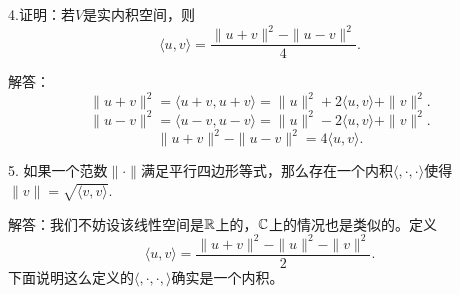 \documentclass[hyperref,]{ctexart}
\begin{document}
\bigskip

\noindent{} 4.证明：若\(V\)是实内积空间，则
\[\langle u,v\rangle = \frac{\|u+v\|^2-\|u-v\|^2}{4}.\]

\smallskip

\noindent{} 解答：
\[\|u+v\|^2 = \langle u+v,u+v\rangle = \|u\|^2 +2\langle u,v\rangle+\|v\|^2.\]
\[\|u-v\|^2 = \langle u-v,u-v\rangle = \|u\|^2 -2\langle u,v\rangle+\|v\|^2.\]
\[\|u+v\|^2  - \|u-v\|^2 = 4\langle u,v\rangle.\]

\bigskip

\noindent{} 5.
如果一个范数\(\|\cdot\|\)满足平行四边形等式，那么存在一个内积\(\langle,\cdot,\cdot\rangle\)使得\(\|v\| = \sqrt{\langle v,v\rangle}\).

\smallskip

\noindent{}
解答：我们不妨设该线性空间是\(\mathbb{R}\)上的，\(\mathbb{C}\)上的情况也是类似的。定义
\[\langle u,v \rangle = \frac{\|u+v\|^2-\|u\|^2-\|v\|^2}{2}.\]
下面说明这么定义的\(\langle,\cdot,\cdot,\rangle\)确实是一个内积。
\end{document}
